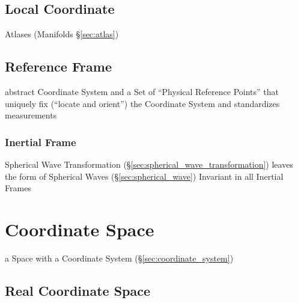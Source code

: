 \subsection{Local Coordinate}\label{sec:local_coordinate}

\fist Atlases (Manifolds \S\ref{sec:atlas})



\subsection{Reference Frame}\label{sec:reference_frame}

abstract Coordinate System and a Set of ``Physical Reference Points'' that
uniquely fix (``locate and orient'') the Coordinate System and standardizes
measurements



\subsubsection{Inertial Frame}\label{sec:intertial_frame}

Spherical Wave Transformation (\S\ref{sec:spherical_wave_transformation})
leaves the form of Spherical Waves (\S\ref{sec:spherical_wave}) Invariant in
all Inertial Frames



\section{Coordinate Space}\label{sec:coordinate_space}

a Space with a Coordinate System (\S\ref{sec:coordinate_system})



\subsection{Real Coordinate Space}\label{sec:real_coordinate_space}

